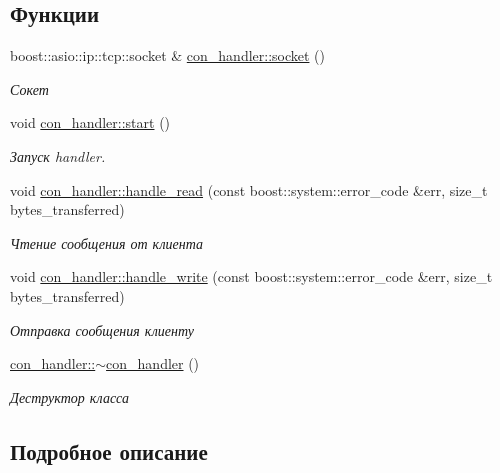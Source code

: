 \subsection*{Функции}
\begin{DoxyCompactItemize}
\item 
boost\+::asio\+::ip\+::tcp\+::socket \& \mbox{\hyperlink{group__con__handler__cpp_gad168c799678add9fb23f3379e1d42b22}{con\+\_\+handler\+::socket}} ()
\begin{DoxyCompactList}\small\item\em Сокет \end{DoxyCompactList}\item 
void \mbox{\hyperlink{group__con__handler__cpp_ga02d6691e226a75525a2ac83062b5c7f7}{con\+\_\+handler\+::start}} ()
\begin{DoxyCompactList}\small\item\em Запуск handler. \end{DoxyCompactList}\item 
void \mbox{\hyperlink{group__con__handler__cpp_ga3b8e9edfc8fed79fcba0242a58b54bc2}{con\+\_\+handler\+::handle\+\_\+read}} (const boost\+::system\+::error\+\_\+code \&err, size\+\_\+t bytes\+\_\+transferred)
\begin{DoxyCompactList}\small\item\em Чтение сообщения от клиента \end{DoxyCompactList}\item 
void \mbox{\hyperlink{group__con__handler__cpp_ga10169d7b3588adb849d7e7c02c46375a}{con\+\_\+handler\+::handle\+\_\+write}} (const boost\+::system\+::error\+\_\+code \&err, size\+\_\+t bytes\+\_\+transferred)
\begin{DoxyCompactList}\small\item\em Отправка сообщения клиенту \end{DoxyCompactList}\item 
\mbox{\hyperlink{group__con__handler__cpp_gaa1bc82c764eb633355a52bd77689ed3f}{con\+\_\+handler\+::$\sim$con\+\_\+handler}} ()
\begin{DoxyCompactList}\small\item\em Деструктор класса \end{DoxyCompactList}\end{DoxyCompactItemize}


\subsection{Подробное описание}


